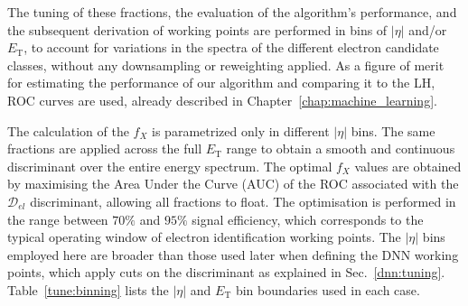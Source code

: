 The tuning of these fractions, the evaluation of the algorithm’s performance, and the subsequent derivation of working points are performed in bins of $|\eta|$ and/or $E_{\text{T}}$, to account for variations in the spectra of the different electron candidate classes, without any downsampling or reweighting applied. 
As a figure of merit for estimating the performance of our algorithm and comparing it to the LH, ROC curves are used, already described in Chapter~\ref{chap:machine_learning}.

The calculation of the $f_{X}$ is parametrized only in different $|\eta|$ bins. The same fractions are applied across the full $E_{\text{T}}$ range to obtain a smooth and continuous discriminant over the entire energy spectrum.
The optimal $f_{X}$ values are obtained by maximising the Area Under the Curve (AUC) of the ROC associated with the $\mathcal{D}_{el}$ discriminant, allowing all fractions to float. The optimisation is performed in the range between $70\%$ and $95\%$ signal efficiency, which corresponds to the typical operating window of electron identification working points. The $|\eta|$ bins employed here are broader than those used later when defining the DNN working points, which apply cuts on the discriminant as explained in Sec.~\ref{dnn:tuning}.
Table~\ref{tune:binning} lists the $|\eta|$ and $E_{\text{T}}$ bin boundaries used in each case.

